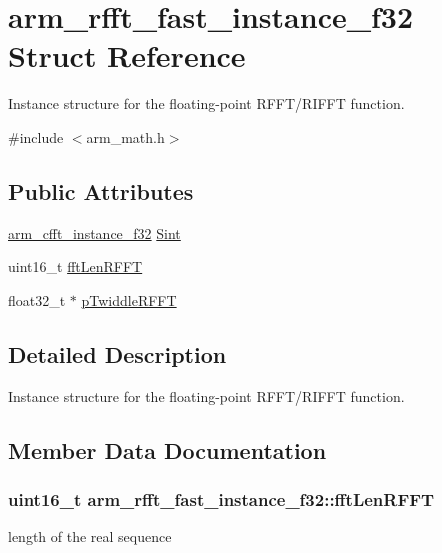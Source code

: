 \hypertarget{structarm__rfft__fast__instance__f32}{}\section{arm\+\_\+rfft\+\_\+fast\+\_\+instance\+\_\+f32 Struct Reference}
\label{structarm__rfft__fast__instance__f32}


Instance structure for the floating-\/point R\+F\+F\+T/\+R\+I\+F\+FT function.  




{\ttfamily \#include $<$arm\+\_\+math.\+h$>$}

\subsection*{Public Attributes}
\begin{DoxyCompactItemize}
\item 
\hyperlink{structarm__cfft__instance__f32}{arm\+\_\+cfft\+\_\+instance\+\_\+f32} \hyperlink{structarm__rfft__fast__instance__f32_a37419ababdfb3151b1891ae6bcd21012}{Sint}
\item 
uint16\+\_\+t \hyperlink{structarm__rfft__fast__instance__f32_aef06ab665041ec36f5b25d464f0cab14}{fft\+Len\+R\+F\+FT}
\item 
float32\+\_\+t $\ast$ \hyperlink{structarm__rfft__fast__instance__f32_a9f30b04f163fabc1b24421d3c323d5fc}{p\+Twiddle\+R\+F\+FT}
\end{DoxyCompactItemize}


\subsection{Detailed Description}
Instance structure for the floating-\/point R\+F\+F\+T/\+R\+I\+F\+FT function. 

\subsection{Member Data Documentation}
\subsubsection[{\texorpdfstring{fft\+Len\+R\+F\+FT}{fftLenRFFT}}]{\setlength{\rightskip}{0pt plus 5cm}uint16\+\_\+t arm\+\_\+rfft\+\_\+fast\+\_\+instance\+\_\+f32\+::fft\+Len\+R\+F\+FT}\hypertarget{structarm__rfft__fast__instance__f32_aef06ab665041ec36f5b25d464f0cab14}{}\label{structarm__rfft__fast__instance__f32_aef06ab665041ec36f5b25d464f0cab14}
length of the real sequence 
